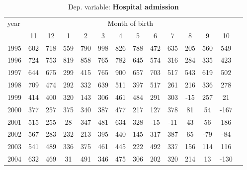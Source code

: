  \begin{table}[H] \begin{threeparttable} \centering \caption{Dep. variable: \textbf{Hospital admission}} {\def\sym#1{\ifmmode^{#1}\else\(^{#1}\)\fi} \begin{tabular}{l*{13}{c}} \toprule year & \multicolumn{12}{c}{Month of birth} \\ \cmidrule(lr){2-13} 
            &          11&          12&           1&           2&           3&           4&           5&           6&           7&           8&           9&          10\\
1995        &         602&         718&         559&         790&         998&         826&         788&         472&         635&         205&         560&         549\\
1996        &         724&         753&         819&         858&         765&         782&         645&         574&         316&         284&         335&         423\\
1997        &         644&         675&         299&         415&         765&         900&         657&         703&         517&         543&         619&         502\\
1998        &         709&         474&         292&         332&         639&         511&         397&         517&         261&         216&         336&         278\\
1999        &         414&         400&         320&         143&         306&         461&         484&         291&         303&         -15&         257&          21\\
2000        &         377&         257&         375&         340&         387&         477&         217&         127&         378&          81&          54&        -167\\
2001        &         515&         255&          28&         347&         481&         634&         328&         -15&         -11&          43&          56&         186\\
2002        &         567&         283&         232&         213&         395&         440&         145&         317&         387&          65&         -79&         -84\\
2003        &         541&         489&         336&         375&         461&         445&         222&         492&         337&         156&         114&         116\\
2004        &         632&         469&          31&         491&         346&         475&         306&         202&         320&         214&          13&        -130\\

\end{tabular}}
\end{threeparttable}
\end{table}
